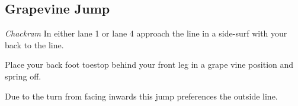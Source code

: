 \subsection{Grapevine Jump}
{\it Chackram}
In either lane 1 or lane 4 approach the line in a side-surf with your back to the line.   

Place your back foot toestop behind your front leg in a grape vine position and spring off. 

Due to the turn from facing inwards this jump preferences the outside line. 

